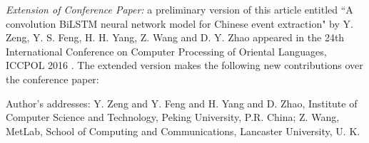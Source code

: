
\begin{bottomstuff}
\emph{Extension of Conference Paper:} a preliminary version of this article entitled ``A convolution BiLSTM neural
network model for Chinese event extraction" by Y. Zeng, Y. S. Feng, H. H. Yang, Z. Wang and D. Y. Zhao appeared in the 24th
International Conference on Computer Processing of Oriental Languages, ICCPOL 2016 \FIXME{\cite{}}. The extended
version makes the following new contributions over the conference paper: 



Author's addresses: Y. Zeng {and} Y. Feng {and} H. Yang {and} D. Zhao, Institute of Computer Science and Technology,
    Peking University, P.R. China; Z. Wang, MetLab, School of Computing and Communications, Lancaster University, U. K.
\end{bottomstuff}
